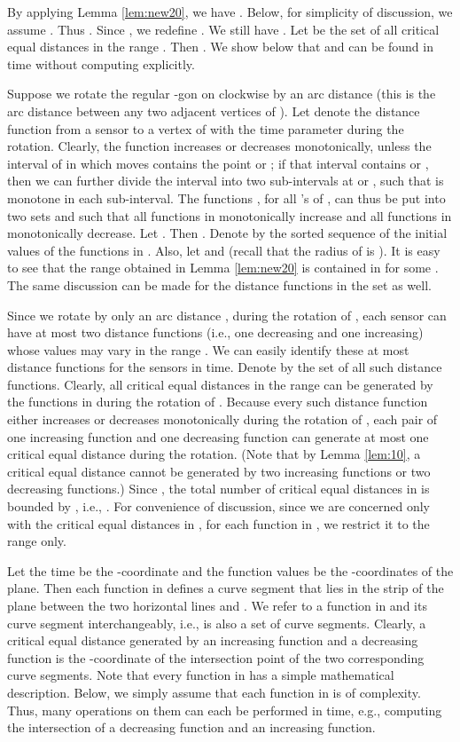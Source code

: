 \documentclass[11pt]{article}
\begin{document}
By applying Lemma \ref{lem:new20}, we have .
Below, for simplicity of discussion, we assume .
Thus . Since
,
we redefine .
We still have .
Let  be the set of all
critical equal distances in the range . Then . We
show below that  and  can be found in
 time without computing  explicitly.



Suppose we rotate the regular -gon  on
 clockwise by an arc distance  (this is the arc
distance between any two adjacent vertices of ). Let
 denote the distance function from a sensor  to a
vertex  of  with the time parameter  during
the rotation. Clearly, the function  increases or
decreases monotonically, unless the interval of  in
which  moves contains the point  or ; if that interval
contains  or , then we can further divide the interval
into two sub-intervals at  or , such that
 is monotone in each sub-interval.
The functions , for all 's of , can thus be
put into two sets  and  such that all functions
in  monotonically increase and all functions in 
monotonically decrease. Let . Then . Denote by
 the sorted sequence of the
initial values of the functions in . Also, let 
and  (recall that the radius of  is ).  It is
easy to see that the range  obtained in Lemma \ref{lem:new20}
is contained in  for some .
The same discussion can be made for the distance functions in the
set  as well.


Since we rotate  by only an arc distance , during the
rotation of , each sensor  can have at most two distance
functions (i.e., one decreasing and one increasing) whose values may
vary in the range . We can easily identify these at
most  distance functions for the  sensors in 
time. Denote by  the set of all such distance functions.
Clearly, all critical equal distances in the range  can be
generated by the functions in  during the rotation of . Because every
such distance function either increases or decreases monotonically
during the rotation of , each pair of one increasing function and
one decreasing function can generate at most one critical equal distance
during the rotation. (Note that by Lemma \ref{lem:10}, a
critical equal distance cannot be generated by two increasing functions or
two decreasing functions.) Since , the total number of
critical equal distances in  is bounded by , i.e.,
. For convenience of discussion, since we are
concerned only with the critical equal distances in , for each
function in , we restrict it to the range  only.

Let the time  be the -coordinate and the function values be
the -coordinates of the plane. Then each function in  defines a curve
segment that lies in the strip of the plane between the two horizontal lines
 and . We refer to a function in
 and its curve segment interchangeably, i.e.,  is
also a set of curve segments. Clearly, a critical equal distance generated by an
increasing function and a decreasing function is the -coordinate of
the intersection point of the two corresponding curve segments.
Note that every function in 
has a simple mathematical description. Below, we simply assume that
each function in  is of  complexity. Thus, many
operations on them can each be performed in  time, e.g., computing the
intersection of a decreasing function and an increasing function.
\end{document}
